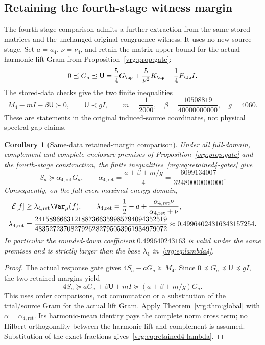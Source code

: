 \documentclass[11pt,a4paper]{article}
\numberwithin{equation}{section}
\newtheorem{corollary}[theorem]{Corollary}
\theoremstyle{definition}\newtheorem{definition}[theorem]{Definition}
\theoremstyle{remark}\newtheorem{remark}[theorem]{Remark}
\newcommand{\E}{\mathcal E}\newcommand{\D}{\mathcal D}
\begin{document}
\subsection{Retaining the fourth-stage witness margin}\label{vrg:sec:retained4}
The fourth-stage comparison admits a further extraction from the same
stored matrices and the unchanged original congruence witness. It uses no
new source stage. Set $a=a_4$, $\nu=\nu_4$, and retain the matrix upper
bound for the actual harmonic-lift Gram from Proposition~\ref{vrg:prop:gate}:
\[
 0\preceq G_a\preceq\mathsf U
 =\frac54G_{\up}+\frac5{\nu^2}K_{\up}-\frac14F_{\lo}I.
\]
The stored-data checks give the two finite inequalities
\begin{equation}\label{vrg:eq:retained4-gates}
 M_4-mI-\beta\mathsf U\succ0,\qquad \mathsf U\prec gI,
 \qquad m=\frac1{2000},\quad
 \beta=\frac{10508819}{40000000000},\quad g=4060.
\end{equation}
These are statements in the original induced-source coordinates, not
physical spectral-gap claims.

\begin{corollary}[Same-data retained-margin comparison]\label{vrg:cor:retained4}
Under all full-domain, complement and complete-enclosure premises of
Proposition~\ref{vrg:prop:gate} and the fourth-stage construction, the
finite inequalities~\eqref{vrg:eq:retained4-gates} give
\begin{equation}\label{vrg:eq:retained4-alpha}
 S_a\succeq\alpha_{4,\mathrm{ret}}G_a,\qquad
 \alpha_{4,\mathrm{ret}}=\frac{a+\beta+m/g}{4}
 =\frac{6099134007}{32480000000000}.
\end{equation}
Consequently, on the full even maximal energy domain,
\begin{align}\label{vrg:eq:retained4-lambda}
 \E[f]&\ge\lambda_{4,\mathrm{ret}}\Var_\mu(f),\qquad
 \lambda_{4,\mathrm{ret}}=\frac12-a+
       \frac{\alpha_{4,\mathrm{ret}}\nu}{\alpha_{4,\mathrm{ret}}+\nu},\\[-2pt]
 \lambda_{4,\mathrm{ret}}
 &=\frac{2415896663121887366359985794094352519}
         {4835272370827926282795053961934979072}
 \approx0.49964024316343157254.\notag
\end{align}
In particular the rounded-down coefficient $0.499640243163$ is valid
under the same premises and is strictly larger than the base
$\lambda_4$ in~\eqref{vrg:eq:lambda4}.
\end{corollary}
\begin{proof}
The actual response gate gives $4S_a-aG_a\succeq M_4$. Since
$0\preceq G_a\preceq\mathsf U\preceq gI$, the two retained margins yield
\[
 4S_a\succeq aG_a+\beta\mathsf U+mI
       \succeq(a+\beta+m/g)G_a.
\]
This uses order comparisons, not commutation or a substitution of the
trial/source Gram for the actual lift Gram. Apply
Theorem~\ref{vrg:thm:global} with $\alpha=\alpha_{4,\mathrm{ret}}$.
Its harmonic-mean identity pays the complete norm cross term; no Hilbert
orthogonality between the harmonic lift and complement is assumed.
Substitution of the exact fractions gives~\eqref{vrg:eq:retained4-lambda}.
\end{proof}
\end{document}

